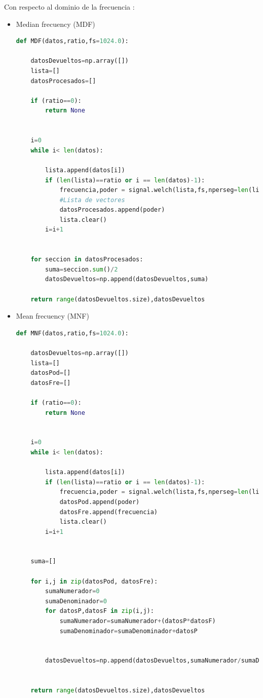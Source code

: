 \newpage
Con respecto al dominio de la frecuencia :
\begin{itemize}
\item Median frecuency (MDF)
\begin{lstlisting}[language=Python]
def MDF(datos,ratio,fs=1024.0):
    
    datosDevueltos=np.array([])
    lista=[]
    datosProcesados=[]
   
    if (ratio==0):
        return None

    
    i=0
    while i< len(datos):
        
        lista.append(datos[i])
        if (len(lista)==ratio or i == len(datos)-1):
            frecuencia,poder = signal.welch(lista,fs,nperseg=len(lista))
            #Lista de vectores
            datosProcesados.append(poder)
            lista.clear()
        i=i+1
        
    
    for seccion in datosProcesados:
        suma=seccion.sum()/2
        datosDevueltos=np.append(datosDevueltos,suma)
    
    return range(datosDevueltos.size),datosDevueltos
\end{lstlisting}

\item Mean frecuency (MNF)
\begin{lstlisting}[language=Python]
def MNF(datos,ratio,fs=1024.0):
    
    datosDevueltos=np.array([])
    lista=[]
    datosPod=[]
    datosFre=[]
    
    if (ratio==0):
        return None

    
    i=0
    while i< len(datos):
        
        lista.append(datos[i])
        if (len(lista)==ratio or i == len(datos)-1):
            frecuencia,poder = signal.welch(lista,fs,nperseg=len(lista))
            datosPod.append(poder)
            datosFre.append(frecuencia)
            lista.clear()
        i=i+1
        
    
    suma=[]
    
    for i,j in zip(datosPod, datosFre):
        sumaNumerador=0
        sumaDenominador=0
        for datosP,datosF in zip(i,j):
            sumaNumerador=sumaNumerador+(datosP*datosF)
            sumaDenominador=sumaDenominador+datosP
            

        datosDevueltos=np.append(datosDevueltos,sumaNumerador/sumaDenominador)

    
    return range(datosDevueltos.size),datosDevueltos
\end{lstlisting}
\end{itemize}
    
